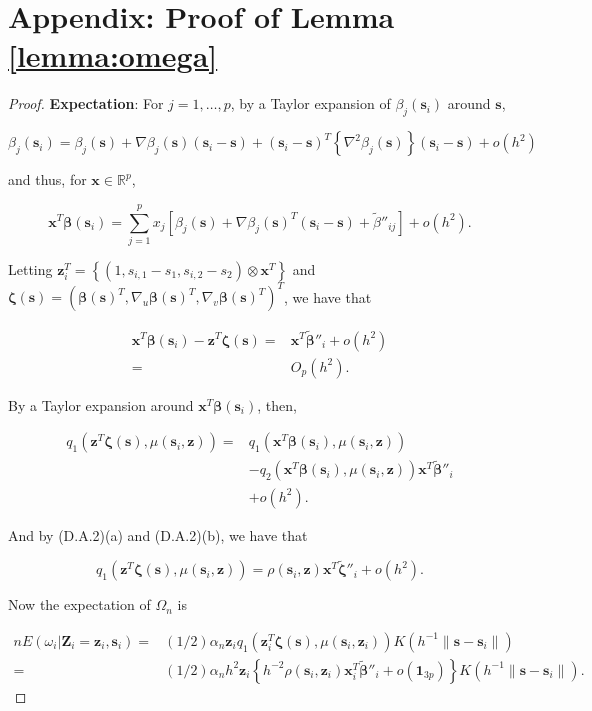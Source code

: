 \documentclass[authoryear,review, 12pt]{elsarticle}
\begin{document}
\section*{Appendix: Proof of Lemma \ref{lemma:omega}}
\begin{proof}
\textbf{Expectation}: For $j=1,\dots,p$, by a Taylor expansion of
$\beta_{j}(\bm{s}_{i})$ around $\bm{s}$,

\[
\beta_{j}(\bm{s}_{i})=\beta_{j}(\bm{s})+\nabla\beta_{j}(\bm{s})(\bm{s}_{i}-\bm{s})+(\bm{s}_{i}-\bm{s})^{T}\left\{ \nabla^{2}\beta_{j}(\bm{s})\right\} (\bm{s}_{i}-\bm{s})+o\left(h^{2}\right)
\]


and thus, for $\bm{x}\in\mathbb{R}^{p}$, 

\[
\bm{x}^{T}\bm{\beta}\!\left(\bm{s}_{i}\right)=\sum_{j=1}^{p}x_{j}\left[\beta_{j}(\bm{s})+\nabla\beta_{j}(\bm{s})^{T}(\bm{s}_{i}-\bm{s})+\tilde{\beta}''_{ij}\right]+o\left(h^{2}\right).
\]


Letting $\bm{z}_{i}^{T}=\left\{ \left(1,s_{i,1}-s_{1},s_{i,2}-s_{2}\right)\otimes\bm{x}^{T}\right\} $
and $\bm{\zeta}(\bm{s})=\left(\bm{\beta}(\bm{s})^{T},\nabla_{u}\bm{\beta}(\bm{s})^{T},\nabla_{v}\bm{\beta}(\bm{s})^{T}\right)^{T}$,
we have that 

\begin{align*}
\bm{x}^{T}\bm{\beta}(\bm{s}_{i})-\bm{z}^{T}\bm{\zeta}(\bm{s})= & \bm{x}^{T}\tilde{\bm{\beta}}''_{i}+o\left(h^{2}\right)\\
= & O_{p}\left(h^{2}\right).
\end{align*}


By a Taylor expansion around $\bm{x}^{T}\bm{\beta}(\bm{s}_{i})$,
then, 

\begin{align*}
q_{1}\left(\bm{z}^{T}\bm{\zeta}(\bm{s}),\mu(\bm{s}_{i},\bm{z})\right)= & q_{1}\left(\bm{x}^{T}\bm{\beta}(\bm{s}_{i}),\mu(\bm{s}_{i},\bm{z})\right)\\
 & -q_{2}\left(\bm{x}^{T}\bm{\beta}(\bm{s}_{i}),\mu(\bm{s}_{i},\bm{z})\right)\bm{x}^{T}\tilde{\bm{\beta}}''_{i}\\
 & +o\left(h^{2}\right).
\end{align*}


And by (D.A.2)(a) and (D.A.2)(b), we have that

\[
q_{1}\left(\bm{z}^{T}\bm{\zeta}(\bm{s}),\mu(\bm{s}_{i},\bm{z})\right)=\rho(\bm{s}_{i},\bm{z})\bm{x}^{T}\tilde{\bm{\zeta}}''_{i}+o\left(h^{2}\right).
\]


Now the expectation of $\Omega_{n}$ is 

\begin{align*}
nE\left(\omega_{i}|\bm{Z}_{i}=\bm{z}_{i},\bm{s}_{i}\right)= & \left(1/2\right)\alpha_{n}\bm{z}_{i}q_{1}\left(\bm{z}_{i}^{T}\bm{\zeta}(\bm{s}),\mu(\bm{s}_{i},\bm{z}_{i})\right)K\left(h^{-1}\|\bm{s}-\bm{s}_{i}\|\right)\\
= & \left(1/2\right)\alpha_{n}h^{2}\bm{z}_{i}\left\{ h^{-2}\rho(\bm{s}_{i},\bm{z}_{i})\bm{x}_{i}^{T}\tilde{\bm{\beta}}''_{i}+o\left(\bm{1}_{3p}\right)\right\} K\left(h^{-1}\|\bm{s}-\bm{s}_{i}\|\right).
\end{align*}



\end{proof}
\end{document}
